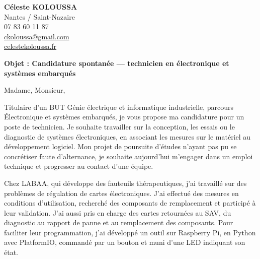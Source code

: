 \documentclass[11pt,a4paper]{article}
\newcommand{\Entreprise}{[Nom de l'entreprise]}
\newcommand{\AdresseEntreprise}{[Adresse de l'entreprise]}
\newcommand{\DateEnvoi}{[Date d'envoi]}
\begin{document}

\textbf{Céleste KOLOUSSA}\\
Nantes / Saint-Nazaire\\
07 83 60 11 87\\
\href{mailto:ckoloussa@gmail.com}{ckoloussa@gmail.com}\\
\href{https://celestekoloussa.fr}{celestekoloussa.fr}




\vspace{1cm}

\textbf{Objet : Candidature spontanée ---
technicien en électronique et systèmes embarqués}

\vspace{0.5cm}

Madame, Monsieur,

Titulaire d'un BUT Génie électrique et informatique
industrielle, parcours Électronique et systèmes embarqués,
je vous propose ma candidature pour un poste de technicien.
Je souhaite travailler sur la conception, les essais ou
le diagnostic de systèmes électroniques, en associant
les mesures sur le matériel au développement logiciel.
Mon projet de poursuite d'études n'ayant pas pu se concrétiser
faute d'alternance, je souhaite aujourd'hui m'engager dans
un emploi technique et progresser au contact d'une équipe.

Chez LABAA, qui développe des fauteuils thérapeutiques,
j'ai travaillé sur des problèmes de régulation de cartes
électroniques. J'ai effectué des mesures en conditions
d'utilisation, recherché des composants de remplacement
et participé à leur validation. J'ai aussi pris en charge
des cartes retournées au SAV, du diagnostic au rapport
de panne et au remplacement des composants. Pour faciliter
leur programmation, j'ai développé un outil sur Raspberry Pi,
en Python avec PlatformIO, commandé par un bouton et muni
d'une LED indiquant son état.
\end{document}
